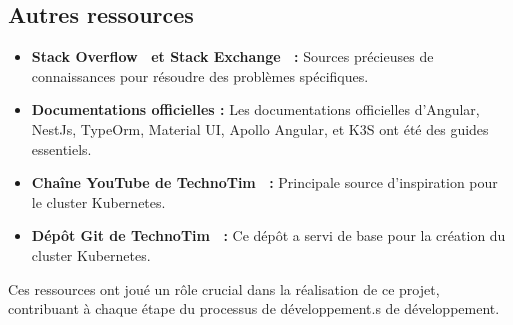 \subsection{Autres ressources}\label{subsec:autres-ressources}
\begin{itemize}
    \item \textbf{Stack Overflow~\cite{StackOve24:online} et Stack Exchange~\cite{HotQuest86:online} :} Sources précieuses de connaissances pour résoudre des problèmes spécifiques.
    \item \textbf{Documentations officielles :} Les documentations officielles d'Angular, NestJs, TypeOrm, Material UI, Apollo Angular, et K3S ont été des guides essentiels.
    \item \textbf{Chaîne YouTube de TechnoTim~\cite{1TechnoT44:online} :} Principale source d'inspiration pour le cluster Kubernetes.
    \item \textbf{Dépôt Git de TechnoTim~\cite{technoti52:online} :} Ce dépôt a servi de base pour la création du cluster Kubernetes.
\end{itemize}

Ces ressources ont joué un rôle crucial dans la réalisation de ce projet, contribuant à chaque étape du processus de développement.s de développement.
